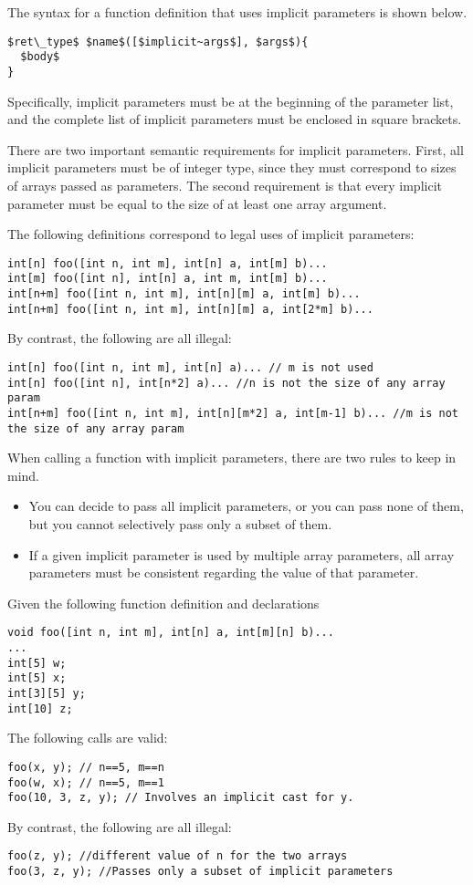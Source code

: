 The syntax for a function definition that uses implicit parameters is shown below.
\begin{lstlisting}
$ret\_type$ $name$([$implicit~args$], $args$){
  $body$
}
\end{lstlisting}
Specifically, implicit parameters must be at the beginning of the parameter list, and the complete list of implicit parameters must be enclosed in square brackets.

There are two important semantic requirements for implicit parameters. First, all implicit parameters must be of integer type, since they must correspond to sizes of arrays passed as parameters. The second requirement is that every implicit parameter must be equal to the size of at least one array argument.

\begin{Example}
The following definitions correspond to legal uses of implicit parameters:
\begin{lstlisting}
int[n] foo([int n, int m], int[n] a, int[m] b)...
int[m] foo([int n], int[n] a, int m, int[m] b)...
int[n+m] foo([int n, int m], int[n][m] a, int[m] b)...
int[n+m] foo([int n, int m], int[n][m] a, int[2*m] b)...
\end{lstlisting}
By contrast, the following are all illegal:
\begin{lstlisting}
int[n] foo([int n, int m], int[n] a)... // m is not used
int[n] foo([int n], int[n*2] a)... //n is not the size of any array param
int[n+m] foo([int n, int m], int[n][m*2] a, int[m-1] b)... //m is not the size of any array param
\end{lstlisting}
\end{Example}

When calling a function with implicit parameters, there are two rules to keep in mind.
\begin{itemize}
\item You can decide to pass all implicit parameters, or you can pass none of them, but you cannot selectively pass only a subset of them.
\item If a given implicit parameter is used by multiple array parameters, all array parameters must be consistent regarding the value of that parameter.
\end{itemize}

\begin{Example}
Given the following function definition and declarations
\begin{lstlisting}
void foo([int n, int m], int[n] a, int[m][n] b)...
...
int[5] w;
int[5] x;
int[3][5] y;
int[10] z;
\end{lstlisting}
The following calls are valid:
\begin{lstlisting}
foo(x, y); // n==5, m==n
foo(w, x); // n==5, m==1
foo(10, 3, z, y); // Involves an implicit cast for y.
\end{lstlisting}

By contrast, the following are all illegal:
\begin{lstlisting}
foo(z, y); //different value of n for the two arrays
foo(3, z, y); //Passes only a subset of implicit parameters
\end{lstlisting}
\end{Example}



